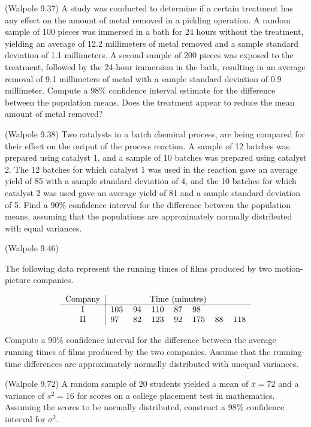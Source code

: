 \documentclass[14pt]{exam}
\begin{document}
\begin{questions}
		\question
		(Walpole 9.37)
            A study was conducted to determine if a certain treatment has any effect on the amount of metal removed in a pickling operation. A random sample of
            100 pieces was immersed in a bath for 24 hours without the treatment, yielding an average of 12.2 millimeters of metal removed and a sample standard deviation of 1.1 millimeters. A second sample of 200 pieces was exposed to the treatment, followed by the 24-hour immersion in the bath, resulting in an average removal of 9.1 millimeters of metal with a sample standard deviation of 0.9 millimeter. Compute a 98\% confidence interval estimate for the difference between the population means. Does the treatment appear to reduce the mean amount of metal removed?
		
		\question
		(Walpole 9.38)
		Two catalysts in a batch chemical process, are being compared for their effect on the output of the process reaction. A sample of 12 batches was prepared using catalyst 1, and a sample of 10 batches was prepared using catalyst 2. The 12 batches for which catalyst 1 was used in the reaction gave an average yield of 85 with a sample standard deviation of 4, and the 10 batches for which catalyst 2 was used gave an average yield of 81 and a sample standard deviation of 5. Find a 90\% confidence interval for the difference between the population means, assuming that the populations are approximately normally distributed with equal variances.
		
		\question
		(Walpole 9.46)
		
		The following data represent the running times of films produced by two motion-picture companies.  

        $$
        \begin{tabular}{c|lllllll}
        \multicolumn{1}{l|}{Company} & \multicolumn{7}{c}{Time (minutes)}   \\ \hline
        I                            & 103 & 94 & 110 & 87 & 98  &    &     \\
        II                           & 97  & 82 & 123 & 92 & 175 & 88 & 118
        \end{tabular}
        \label{tab:9_46}
        $$


  Compute a 90\% confidence interval for the difference between the average running times of films produced by the two companies. Assume that the running-time differences are approximately normally distributed with unequal variances.
		
		\question
		(Walpole 9.72)
            A random sample of 20 students yielded a mean of $\overline{x} = 72$ and a variance of $s^2 = 16$ for scores on a college placement test in mathematics. Assuming the scores to be normally distributed, construct a $98\%$ confidence interval for $\sigma^2$.


\end{questions}
\end{document}
